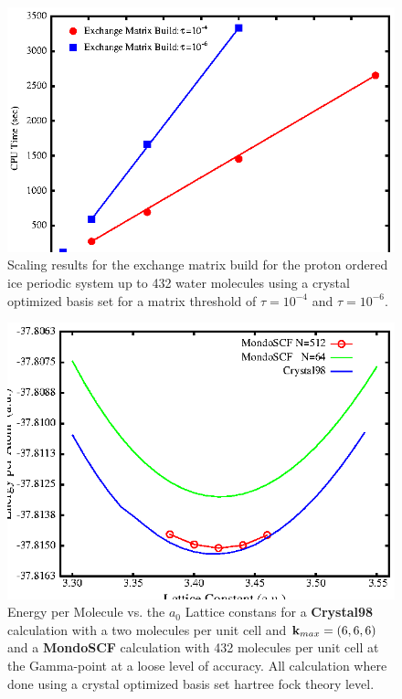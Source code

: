 \documentclass[prb,aps,nobibnotes,twocolumn,doublespace,twocolumngrid,superbib]{revtex4}
\begin{document}
%
%
%
\begin{figure}
\caption{Scaling results for the exchange matrix
build  for the proton ordered ice periodic system up to 432 water molecules 
using a crystal optimized basis set\cite{CBS:511G:H,CBS:861G:MgO} for a matrix threshold of 
$\tau=10^{-4}$ and  $\tau=10^{-6}$.}
\label{figure:Scaling_Matrix_Build_Ice}
{\centering \includegraphics{Timing_pIce_ONX_2.ps} \par} 
\end{figure}
%
%
%
\begin{figure}
\caption{Energy per Molecule vs. the $a_0$ Lattice constans for a {\bf Crystal98} calculation 
with a two molecules per unit cell and ${\bf k}_{max} = (6,6,6)$ and a {\bf MondoSCF} calculation 
with 432 molecules  per unit cell at the Gamma-point at a loose level of accuracy.
All calculation where done using a crystal optimized basis set\cite{CBS:511G:H,CBS:861G:MgO} hartree fock theory level. }
\label{figure:EnergyVsLattice_Ice}
{\centering \includegraphics{pIce_En_vs_a.ps} \par} 
\end{figure}
%
%
%
%
\end{document}
